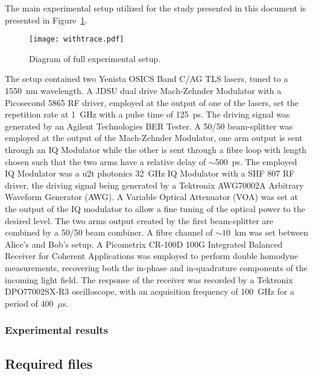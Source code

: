 The main experimental setup utilized for the study presented in this document is presented in Figure~\ref{fig:expDia}.
\begin{figure}[h]
\centering
\texttt{[image: withtrace.pdf]}
\caption{Diagram of full experimental setup.}
\label{fig:expDia}
\end{figure}
The setup contained two Yenista OSICS Band C/AG TLS lasers, tuned to a 1550~nm wavelength. A JDSU dual drive Mach-Zehnder Modulator with a Picosecond 5865 RF driver, employed at the output of one of the lasers, set the repetition rate at 1~GHz with a pulse time of 125~ps. The driving signal was generated by an Agilent Technologies BER Tester. A 50/50 beam-splitter was employed at the output of the Mach-Zehnder Modulator, one arm output is sent through an IQ Modulator while the other is sent through a fibre loop with length chosen such that the two arms have a relative delay of $\sim$500~ps. The employed IQ Modulator was a u2t photonics 32~GHz IQ Modulator with a SHF 807 RF driver, the driving signal being generated by a Tektronix AWG70002A Arbitrary Waveform Generator (AWG). A Variable Optical Attenuator (VOA) was set at the output of the IQ modulator to allow a fine tuning of the optical power to the desired level. The two arms output created by the first beam-splitter are combined by a 50/50 beam combiner. A fibre channel of $\sim10$~km was set between Alice's and Bob's setup. A Picometrix CR-100D 100G Integrated Balanced Receiver for Coherent Applications was employed to perform double homodyne measurements, recovering both the in-phase and in-quadrature components of the incoming light field. The response of the receiver was recorded by a Tektronix DPO77002SX-R3 oscilloscope, with an acquisition frequency of 100~GHz for a period of 400~$\mu$s.

\subsubsection*{Experimental results}

\subsection*{Required files}\label{Required files}

